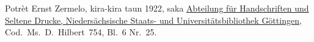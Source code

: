 Potrèt Ernst Zermelo, kira-kira taun 1922, saka
\href{http://www.sub.uni-goettingen.de/en/contact/departments-a-z/departmental-and-unit-details/abteilunggruppe/handschriften-und-seltene-drucke/}{Abteilung
f\"ur Handschriften und Seltene Drucke, Nieders\"achsische Staats- und
Universit\"atsbibliothek G\"ottingen}, Cod.~Ms.~D.~Hilbert~754,
Bl.~6 Nr.~25.
